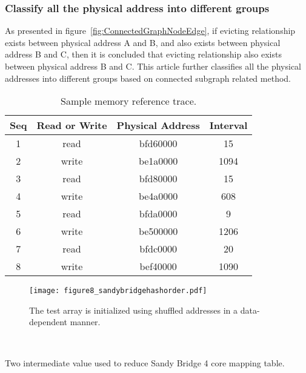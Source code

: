 \documentclass[conference]{IEEEtran}
\newcommand{\otoprule}{\midrule[\heavyrulewidth]}
\begin{document}
\subsubsection{Classify all the physical address into different groups}
As presented in figure~\ref{fig:ConnectedGraphNodeEdge}, if evicting relationship exists between physical address A and B, and also exists between physical address B and C, then it is concluded that evicting relationship also exists between physical address B and C. This article further classifies all the physical addresses into different groups based on connected subgraph related method. 
\clearpage
\begin{table}[!htbp]
\caption{Sample memory reference trace.}
\begin{center}
\begin{tabular}{cccc} 
\toprule
Seq	& Read or Write	&	Physical Address&	Interval \\ \otoprule
1	&	read	&	bfd60000	&	15	 \\ \midrule
2	&	write	&	be1a0000	&	1094	 \\ \midrule
3	&	read	&	bfd80000	&	15	 \\ \midrule
4	&	write	&	be4a0000	&	608	 \\ \midrule
5	&	read	&	bfda0000	&	9	 \\ \midrule
6	&	write	&	be500000	&	1206	 \\ \midrule
7	&	read	&	bfdc0000	&	20	 \\ \midrule
8	&	write	&	bef40000	&	1090	 \\ 
\bottomrule
\end{tabular}
\end{center}
\label{table:SampleMemoryReferenceTrace}
\end{table}
\begin{figure}[!htbp]
\centering
\texttt{[image: figure8\_sandybridgehashorder.pdf]}
\caption{The test array is initialized using shuffled addresses in a data-dependent manner.}
\label{fig:cyclicaccess}
\end{figure}
\begin{table*}
	\begin{subtable}{}
		
	\end{subtable}
	~
\begin{subtable}{}
		
	\end{subtable}
	\caption{Two intermediate value used to reduce Sandy Bridge 4 core mapping table.}
	\label{fig:TwoIntermediateValue}
\end{table*}
\end{document}
